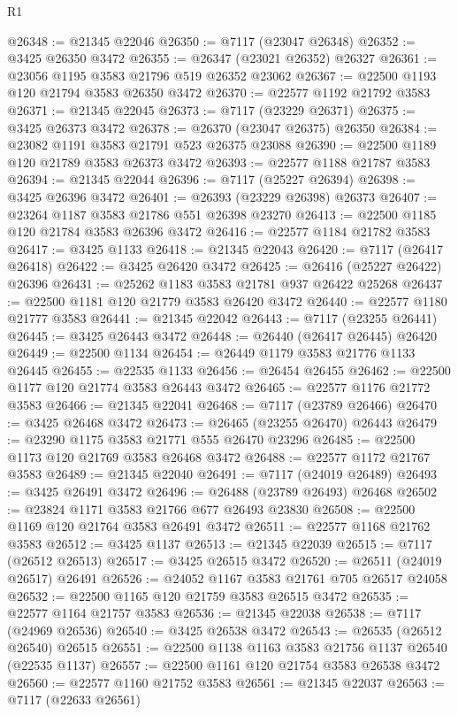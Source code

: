 \begin{lexlean}{R1}
\begin{coremodule}
@26348 := @21345 @22046
@26350 := @7117 (@23047 @26348)
@26352 := @3425 @26350 @3472
@26355 := @26347 (@23021 @26352) @26327
@26361 := @23056 @1195 @3583 @21796 @519 @26352 @23062
@26367 := @22500 @1193 @120 @21794 @3583 @26350 @3472
@26370 := @22577 @1192 @21792 @3583
@26371 := @21345 @22045
@26373 := @7117 (@23229 @26371)
@26375 := @3425 @26373 @3472
@26378 := @26370 (@23047 @26375) @26350
@26384 := @23082 @1191 @3583 @21791 @523 @26375 @23088
@26390 := @22500 @1189 @120 @21789 @3583 @26373 @3472
@26393 := @22577 @1188 @21787 @3583
@26394 := @21345 @22044
@26396 := @7117 (@25227 @26394)
@26398 := @3425 @26396 @3472
@26401 := @26393 (@23229 @26398) @26373
@26407 := @23264 @1187 @3583 @21786 @551 @26398 @23270
@26413 := @22500 @1185 @120 @21784 @3583 @26396 @3472
@26416 := @22577 @1184 @21782 @3583
@26417 := @3425 @1133
@26418 := @21345 @22043
@26420 := @7117 (@26417 @26418)
@26422 := @3425 @26420 @3472
@26425 := @26416 (@25227 @26422) @26396
@26431 := @25262 @1183 @3583 @21781 @937 @26422 @25268
@26437 := @22500 @1181 @120 @21779 @3583 @26420 @3472
@26440 := @22577 @1180 @21777 @3583
@26441 := @21345 @22042
@26443 := @7117 (@23255 @26441)
@26445 := @3425 @26443 @3472
@26448 := @26440 (@26417 @26445) @26420
@26449 := @22500 @1134
@26454 := @26449 @1179 @3583 @21776 @1133 @26445
@26455 := @22535 @1133
@26456 := @26454 @26455
@26462 := @22500 @1177 @120 @21774 @3583 @26443 @3472
@26465 := @22577 @1176 @21772 @3583
@26466 := @21345 @22041
@26468 := @7117 (@23789 @26466)
@26470 := @3425 @26468 @3472
@26473 := @26465 (@23255 @26470) @26443
@26479 := @23290 @1175 @3583 @21771 @555 @26470 @23296
@26485 := @22500 @1173 @120 @21769 @3583 @26468 @3472
@26488 := @22577 @1172 @21767 @3583
@26489 := @21345 @22040
@26491 := @7117 (@24019 @26489)
@26493 := @3425 @26491 @3472
@26496 := @26488 (@23789 @26493) @26468
@26502 := @23824 @1171 @3583 @21766 @677 @26493 @23830
@26508 := @22500 @1169 @120 @21764 @3583 @26491 @3472
@26511 := @22577 @1168 @21762 @3583
@26512 := @3425 @1137
@26513 := @21345 @22039
@26515 := @7117 (@26512 @26513)
@26517 := @3425 @26515 @3472
@26520 := @26511 (@24019 @26517) @26491
@26526 := @24052 @1167 @3583 @21761 @705 @26517 @24058
@26532 := @22500 @1165 @120 @21759 @3583 @26515 @3472
@26535 := @22577 @1164 @21757 @3583
@26536 := @21345 @22038
@26538 := @7117 (@24969 @26536)
@26540 := @3425 @26538 @3472
@26543 := @26535 (@26512 @26540) @26515
@26551 := @22500 @1138 @1163 @3583 @21756 @1137 @26540 (@22535 @1137)
@26557 := @22500 @1161 @120 @21754 @3583 @26538 @3472
@26560 := @22577 @1160 @21752 @3583
@26561 := @21345 @22037
@26563 := @7117 (@22633 @26561)

\end{coremodule}
\end{lexlean}

